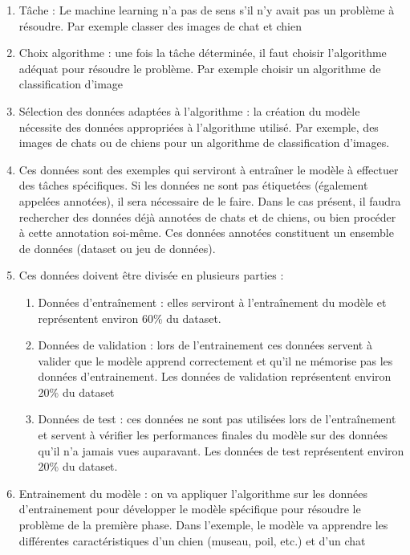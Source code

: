 \begin{enumerate}
    \item Tâche : Le machine learning n'a pas de sens s'il n'y avait pas un problème à résoudre. Par exemple classer des images de chat et chien
    
    \item Choix algorithme : une fois la tâche déterminée, il faut choisir l'algorithme adéquat pour résoudre le problème. Par exemple choisir un algorithme de classification d'image
    
    \item Sélection des données adaptées à l'algorithme : la création du modèle nécessite des données appropriées à l'algorithme utilisé. Par exemple, des images de chats ou de chiens pour un algorithme de classification d'images.
    
    \item Ces données sont des exemples qui serviront à entraîner le modèle à effectuer des tâches spécifiques. Si les données ne sont pas étiquetées (également appelées annotées), il sera nécessaire de le faire. Dans le cas présent, il faudra rechercher des données déjà annotées de chats et de chiens, ou bien procéder à cette annotation soi-même. Ces données annotées constituent un ensemble de données (dataset ou jeu de données).
    
    \item Ces données doivent être divisée en plusieurs parties :
    \begin{enumerate}
        \item Données d'entraînement : elles serviront à l'entraînement du modèle et représentent environ 60\% du dataset.
        \item Données de validation : lors de l'entrainement ces données servent à valider que le modèle apprend correctement et qu'il ne mémorise pas les données d'entrainement. Les données de validation représentent environ 20\% du dataset
        \item Données de test : ces données ne sont pas utilisées lors de l'entraînement et servent à vérifier les performances finales du modèle sur des données qu'il n'a jamais vues auparavant. Les données de test représentent environ 20\% du dataset.
    \end{enumerate}
    
    \item Entrainement du modèle : on va appliquer l'algorithme sur les données \\ d'entrainement pour développer le modèle spécifique pour résoudre le problème de la première phase. Dans l'exemple, le modèle va apprendre les différentes caractéristiques d'un chien (museau, poil, etc.) et d'un chat
    

\end{enumerate}
